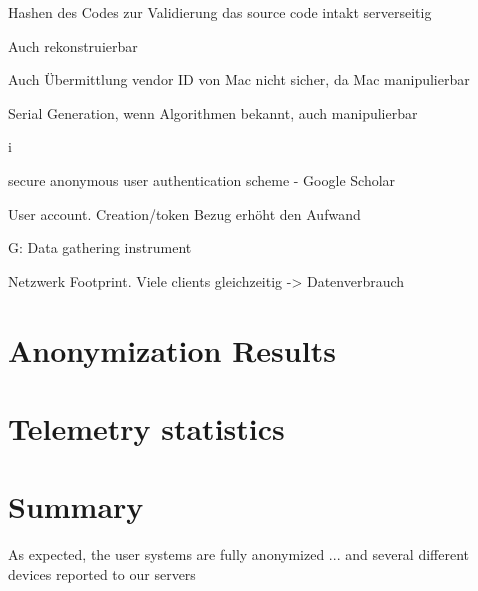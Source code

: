 Hashen des Codes zur Validierung das source code intakt serverseitig

Auch rekonstruierbar

Auch Übermittlung vendor ID von Mac nicht sicher, da Mac manipulierbar

Serial Generation, wenn Algorithmen bekannt, auch manipulierbar

i%

secure anonymous user authentication scheme - Google Scholar



User account. Creation/token Bezug erhöht den Aufwand

G: Data gathering instrument

Netzwerk Footprint. Viele clients gleichzeitig -> Datenverbrauch

%
\newpage
%
 


\section{Anonymization Results}
\label{sec:results:anon}


%


\section{Telemetry statistics}
\label{sec:results:telemetry}
%


\section{Summary}
As expected, the user systems are fully anonymized ... and several different devices reported to our servers
